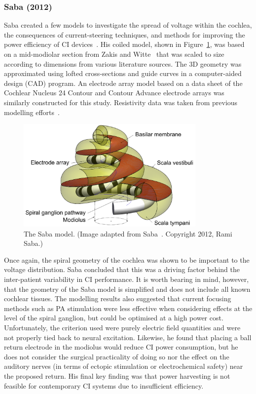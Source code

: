 \subsubsection{Saba (2012)}

Saba created a few models to investigate the spread of voltage within the
cochlea, the consequences of current-steering techniques, and methods for
improving the power efficiency of CI devices~\cite{saba2012}. His coiled model,
shown in Figure~\ref{fig:model_saba}, was based on a mid-modiolar section from
Zakis and Witte~\cite{zakis2001} that was scaled to size according to dimensions
from various literature sources. The 3D geometry was approximated using lofted
cross-sections and guide curves in a computer-aided design (CAD) program. An
electrode array model based on a data sheet of the Cochlear Nucleus 24 Contour
and Contour Advance electrode arrays was similarly constructed for this study.
Resistivity data was taken from previous modelling
efforts~\cite{finley1990,hanekom2001,briaire2000mesh,rattay2001model}.

\begin{figure}
	\centering
	\includegraphics[height=5.5cm]{Background/saba_3D}	
	\caption[The Saba model]{The Saba model. (Image adapted from
	Saba~\cite{saba2012}. Copyright \textcopyright{} 2012, Rami Saba.)}
	\label{fig:model_saba}
\end{figure}

Once again, the spiral geometry of the cochlea was shown to be important to the
voltage distribution. Saba concluded that this was a driving factor behind the
inter-patient variability in CI performance. It is worth bearing in mind,
however, that the geometry of the Saba model is simplified and does not include
all known cochlear tissues. The modelling results also suggested that current
focusing methods such as PA stimulation were less effective when considering
effects at the level of the spiral ganglion, but could be optimised at a high
power cost. Unfortunately, the criterion used were purely electric field
quantities and were not properly tied back to neural excitation. Likewise, he
found that placing a ball return electrode in the modiolus would reduce CI power
consumption, but he does not consider the surgical practicality of doing so nor
the effect on the auditory nerves (in terms of ectopic stimulation or
electrochemical safety) near the proposed return. His final key finding was that
power harvesting is not feasible for contemporary CI systems due to insufficient
efficiency.

